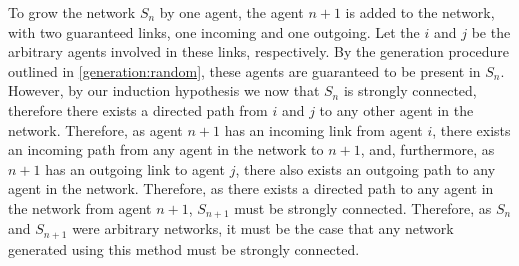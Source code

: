 \documentclass{article}
\begin{document}
To grow the network $S_n$ by one agent, the agent $n+1$ is added to the network, with two guaranteed links, one incoming and one outgoing. Let the $i$ and $j$ be the arbitrary agents involved in these links, respectively. By the generation procedure outlined in \ref{generation:random}, these agents are guaranteed to be present in $S_n$. However, by our induction hypothesis we now that $S_n$ is strongly connected, therefore there exists a directed path from $i$ and $j$ to any other agent in the network. Therefore, as agent $n+1$ has an incoming link from agent $i$, there exists an incoming path from any agent in the network to $n+1$, and, furthermore, as $n+1$ has an outgoing link to agent $j$, there also exists an outgoing path to any agent in the network. Therefore, as there exists a directed path to any agent in the network from agent $n+1$, $S_{n+1}$ must be strongly connected.\newline
Therefore, as $S_n$ and $S_{n+1}$ were arbitrary networks, it must be the case that any network generated using this method must be strongly connected.\newline




\newpage
\end{document}
